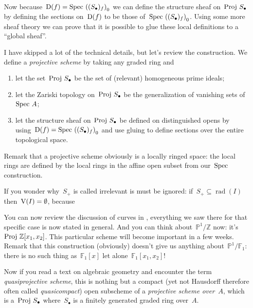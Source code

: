 Now because~$\operatorname{D}(f)=\operatorname{Spec\,}\left( (S_\bullet)_f \right)_0$ we can define the structure sheaf on~$\operatorname{Proj\,} S_\bullet$ by defining the sections on~$\operatorname{D}(f)$ to be those of~$\operatorname{Spec\,}\left( (S_\bullet)_f \right)_0$. Using some more sheaf theory we can prove that it is possible to glue these local definitions to a ``global sheaf''.

I have skipped a lot of the technical details, but let's review the construction. We define a \emph{projective scheme} by taking any graded ring and
\begin{enumerate}
  \item let the set~$\operatorname{Proj\,} S_\bullet$ be the set of (relevant) homogeneous prime ideals;
  \item let the Zariski topology on~$\operatorname{Proj\,} S_\bullet$ be the generalization of vanishing sets of~$\operatorname{Spec\,} A$;
  \item let the structure sheaf on~$\operatorname{Proj\,} S_\bullet$ be defined on distinguished opens by using~$\operatorname{D}(f)=\operatorname{Spec\,}\left( (S_\bullet)_f \right)_0$ and use gluing to define sections over the entire topological space.
\end{enumerate}
Remark that a projective scheme obviously is a locally ringed space: the local rings are defined by the local rings in the affine open subset from our~$\operatorname{Spec\,}$ construction.

\begin{remark}
  If you wonder why~$S_+$ is called irrelevant is must be ignored: if~$S_+\subseteq\operatorname{rad}(I)$ then~$\operatorname{V}(I)=\emptyset$, because
\end{remark}

You can now review the discussion of curves in , everything we saw there for that specific case is now stated in general. And you can think about~$\mathbb{P}^1/\mathbb{Z}$ now: it's~$\operatorname{Proj\,}\mathbb{Z}[x_1,x_2]$. This particular scheme will become important in a few weeks. Remark that this construction (obviously) doesn't give us anything about~$\mathbb{P}^1/\mathbb{F}_1$: there is no such thing as~$\mathbb{F}_1[x]$ let alone~$\mathbb{F}_1[x_1,x_2]$!

Now if you read a text on algebraic geometry and encounter the term \emph{quasiprojective scheme}, this is nothing but a compact (yet not Hausdorff therefore often called \emph{quasicompact}) open subscheme of a \emph{projective scheme over~$A$}, which is a~$\operatorname{Proj\,} S_\bullet$ where~$S_\bullet$ is a finitely generated graded ring over~$A$.


